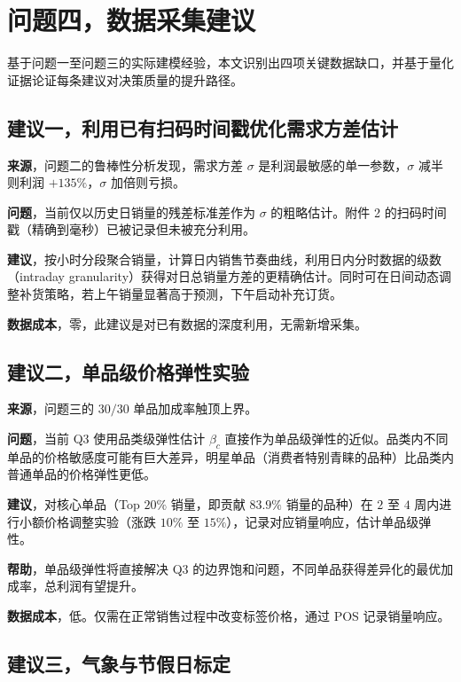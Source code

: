 \section{问题四，数据采集建议}

基于问题一至问题三的实际建模经验，本文识别出四项关键数据缺口，并基于量化证据论证每条建议对决策质量的提升路径。

\subsection{建议一，利用已有扫码时间戳优化需求方差估计}

\textbf{来源}，问题二的鲁棒性分析发现，需求方差 $\sigma$ 是利润最敏感的单一参数，$\sigma$ 减半则利润 $+135\%$，$\sigma$ 加倍则亏损。

\textbf{问题}，当前仅以历史日销量的残差标准差作为 $\sigma$ 的粗略估计。附件 2 的扫码时间戳（精确到毫秒）已被记录但未被充分利用。

\textbf{建议}，按小时分段聚合销量，计算日内销售节奏曲线，利用日内分时数据的级数（intraday granularity）获得对日总销量方差的更精确估计。同时可在日间动态调整补货策略，若上午销量显著高于预测，下午启动补充订货。

\textbf{数据成本}，零，此建议是对已有数据的深度利用，无需新增采集。

\subsection{建议二，单品级价格弹性实验}

\textbf{来源}，问题三的 $30/30$ 单品加成率触顶上界。

\textbf{问题}，当前 Q3 使用品类级弹性估计 $\beta_c$ 直接作为单品级弹性的近似。品类内不同单品的价格敏感度可能有巨大差异，明星单品（消费者特别青睐的品种）比品类内普通单品的价格弹性更低。

\textbf{建议}，对核心单品（Top $20\%$ 销量，即贡献 $83.9\%$ 销量的品种）在 $2$ 至 $4$ 周内进行小额价格调整实验（涨跌 $10\%$ 至 $15\%$），记录对应销量响应，估计单品级弹性。

\textbf{帮助}，单品级弹性将直接解决 Q3 的边界饱和问题，不同单品获得差异化的最优加成率，总利润有望提升。

\textbf{数据成本}，低。仅需在正常销售过程中改变标签价格，通过 POS 记录销量响应。

\subsection{建议三，气象与节假日标定}

